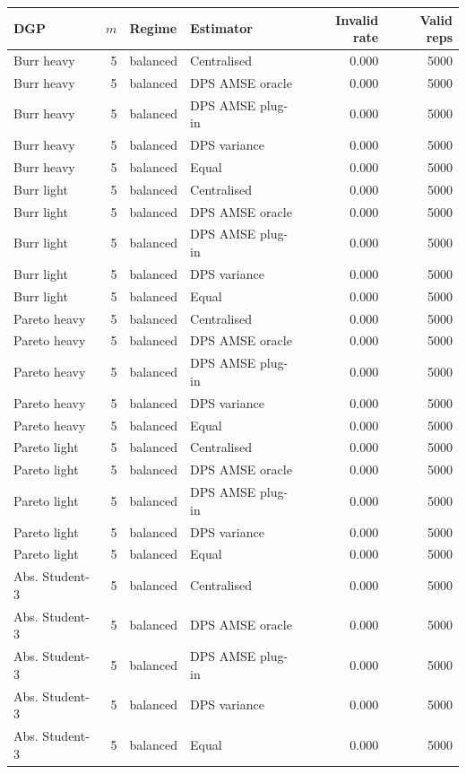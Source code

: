 \begin{tabular}{lrllrr}
\toprule
DGP & $m$ & Regime & Estimator & Invalid rate & Valid reps \\
\midrule
Burr heavy & 5 & balanced & Centralised & 0.000 & 5000 \\
Burr heavy & 5 & balanced & DPS AMSE oracle & 0.000 & 5000 \\
Burr heavy & 5 & balanced & DPS AMSE plug-in & 0.000 & 5000 \\
Burr heavy & 5 & balanced & DPS variance & 0.000 & 5000 \\
Burr heavy & 5 & balanced & Equal & 0.000 & 5000 \\
Burr light & 5 & balanced & Centralised & 0.000 & 5000 \\
Burr light & 5 & balanced & DPS AMSE oracle & 0.000 & 5000 \\
Burr light & 5 & balanced & DPS AMSE plug-in & 0.000 & 5000 \\
Burr light & 5 & balanced & DPS variance & 0.000 & 5000 \\
Burr light & 5 & balanced & Equal & 0.000 & 5000 \\
Pareto heavy & 5 & balanced & Centralised & 0.000 & 5000 \\
Pareto heavy & 5 & balanced & DPS AMSE oracle & 0.000 & 5000 \\
Pareto heavy & 5 & balanced & DPS AMSE plug-in & 0.000 & 5000 \\
Pareto heavy & 5 & balanced & DPS variance & 0.000 & 5000 \\
Pareto heavy & 5 & balanced & Equal & 0.000 & 5000 \\
Pareto light & 5 & balanced & Centralised & 0.000 & 5000 \\
Pareto light & 5 & balanced & DPS AMSE oracle & 0.000 & 5000 \\
Pareto light & 5 & balanced & DPS AMSE plug-in & 0.000 & 5000 \\
Pareto light & 5 & balanced & DPS variance & 0.000 & 5000 \\
Pareto light & 5 & balanced & Equal & 0.000 & 5000 \\
Abs. Student-3 & 5 & balanced & Centralised & 0.000 & 5000 \\
Abs. Student-3 & 5 & balanced & DPS AMSE oracle & 0.000 & 5000 \\
Abs. Student-3 & 5 & balanced & DPS AMSE plug-in & 0.000 & 5000 \\
Abs. Student-3 & 5 & balanced & DPS variance & 0.000 & 5000 \\
Abs. Student-3 & 5 & balanced & Equal & 0.000 & 5000 \\

\end{tabular}
